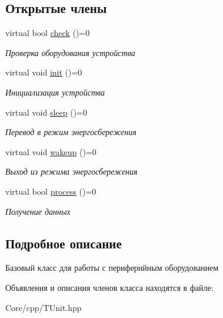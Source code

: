 \subsection*{Открытые члены}
\begin{DoxyCompactItemize}
\item 
\mbox{\label{classunit_1_1_t_unit_abdcc6daabc86cea10abc96593d9d2c2a}} 
virtual bool \hyperlink{classunit_1_1_t_unit_abdcc6daabc86cea10abc96593d9d2c2a}{check} ()=0
\begin{DoxyCompactList}\small\item\em Проверка оборудования устройства \end{DoxyCompactList}\item 
\mbox{\label{classunit_1_1_t_unit_afc001dd57ba88e571e6b650a416b76a5}} 
virtual void \hyperlink{classunit_1_1_t_unit_afc001dd57ba88e571e6b650a416b76a5}{init} ()=0
\begin{DoxyCompactList}\small\item\em Инициализация устройства \end{DoxyCompactList}\item 
\mbox{\label{classunit_1_1_t_unit_afa851323a357e4287ca230d2bce8977b}} 
virtual void \hyperlink{classunit_1_1_t_unit_afa851323a357e4287ca230d2bce8977b}{sleep} ()=0
\begin{DoxyCompactList}\small\item\em Перевод в режим энергосбережения \end{DoxyCompactList}\item 
\mbox{\label{classunit_1_1_t_unit_a11fd67d0186e8e60ef517d6a44db225f}} 
virtual void \hyperlink{classunit_1_1_t_unit_a11fd67d0186e8e60ef517d6a44db225f}{wakeup} ()=0
\begin{DoxyCompactList}\small\item\em Выход из режима энергосбережения \end{DoxyCompactList}\item 
\mbox{\label{classunit_1_1_t_unit_a108691c8b988d97c65237c83a31db706}} 
virtual bool \hyperlink{classunit_1_1_t_unit_a108691c8b988d97c65237c83a31db706}{process} ()=0
\begin{DoxyCompactList}\small\item\em Получение данных \end{DoxyCompactList}\end{DoxyCompactItemize}


\subsection{Подробное описание}
Базовый класс для работы с периферийным оборудованием 

Объявления и описания членов класса находятся в файле\+:\begin{DoxyCompactItemize}
\item 
Core/cpp/T\+Unit.\+hpp\end{DoxyCompactItemize}
